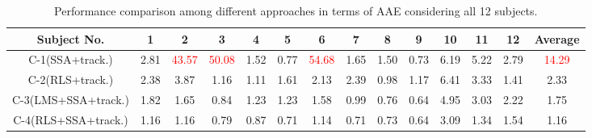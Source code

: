 \documentclass[final,3p,times,authoryear]{elsarticle}
\begin{document}
\setlength{\arrayrulewidth}{.1mm}
\setlength{\tabcolsep}{6.5pt}
\renewcommand{\arraystretch}{1.3}

\begin{table*}[t]
  \centering
\caption{Performance comparison among different approaches in terms of AAE considering all 12 subjects.}
  \label{table:comparison}
  \begin{tabular}{c|c|c|c|c|c|c|c|c|c|c|c|c|c}
  
    \hline
     Subject No. & 1 & 2 & 3 & 4 & 5 & 6 & 7 &  8 & 9 & 10 & 11 & 12& Average\\
    
   \hline
    
    C-1(SSA+track.) & 2.81  & \textcolor{red}{43.57} &  \textcolor{red}{50.08} & 1.52 & 0.77 & \textcolor{red}{54.68} & 1.65 & 1.50 & 0.73 & 6.19 & 5.22 & 2.79 & \textcolor{red}{14.29}\\
    
    \hline
    C-2(RLS+track.)   &     2.38  &	3.87 &	1.16 &	1.11 &	1.61 &	2.13 &	2.39 &	 0.98	& 1.17 & 	6.41 &	3.33 &	1.41 & 2.33\\
   
    
    \hline
    
    C-3(LMS+SSA+track.) & 1.82 &   1.65 &  0.84 &  1.23 & 1.23 &  1.58 &  0.99 &	0.76 &	0.64 &	4.95 &	3.03 &   2.22 & 1.75\\
    
    \hline
    
        C-4(RLS+SSA+track.) &     1.16  &  1.16  &  0.79  &  0.87    & 0.71  &  1.14  &  0.71  &  0.73  &  0.64  &  3.09   & 1.34  &  1.54 & 1.16\\ 
    \hline
    
   
    \hline
  \end{tabular}
    
\end{table*}

\setlength{\arrayrulewidth}{.1mm}
\setlength{\tabcolsep}{5.5pt}
\renewcommand{\arraystretch}{1.3}
\end{document}
